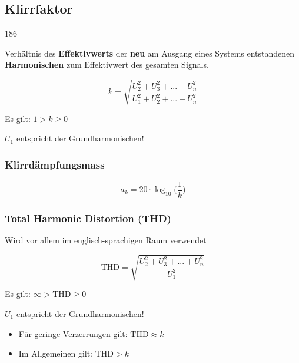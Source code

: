 \subsection{Klirrfaktor}{186}

Verhältnis des \textbf{Effektivwerts} der \textbf{neu} am Ausgang eines Systems entstandenen \textbf{Harmonischen} zum Effektivwert des 
gesamten Signals.

\vspace{0.2cm}

\begin{minipage}[c]{0.55\columnwidth}
	$$ \boxed{ k = \sqrt{\frac{U_2^2 + U_3^2 + ...+ U_n^2}{U_1^2 + U_2^2 + ...+ U_n^2}}} $$
\end{minipage}
\hfill
\begin{minipage}[c]{0.4\columnwidth}
	Es gilt: $1 > k \geq 0$
\end{minipage}

\vspace{0.2cm}

$U_1$ entspricht der Grundharmonischen!


\subsubsection{Klirrdämpfungsmass}

\vspace{-0.2cm}
$$ \boxed{ a_k = 20 \cdot \log_{10} \Big( \frac{1}{k}  \Big)  } $$


\subsubsection{Total Harmonic Distortion (THD)}

Wird vor allem im englisch-sprachigen Raum verwendet

\vspace{0.2cm}

\begin{minipage}[c]{0.55\columnwidth}
	$$ \boxed{  \text{THD} = \sqrt{\frac{U_2^2 + U_3^2 + ...+ U_n^2}{U_1^2} } } $$
\end{minipage}
\hfill
\begin{minipage}[c]{0.4\columnwidth}
	Es gilt: $\infty > \text{THD} \geq 0$
\end{minipage}

\vspace{0.2cm}

$U_1$ entspricht der Grundharmonischen! 

\vspace{0.2cm}
\begin{itemize}
	\item Für geringe Verzerrungen gilt: $\text{THD} \approx k$
	\item Im Allgemeinen gilt: $\text{THD} > k$
\end{itemize}

